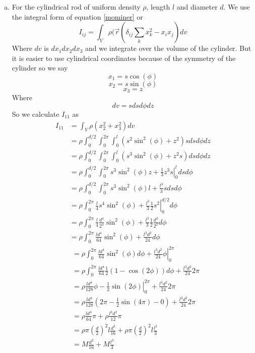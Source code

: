 \documentclass[11pt]{article}
\numberwithin{equation}{section}
\begin{document}
\begin{enumerate}[(a)]
\item
For the cylindrical rod of uniform density $\rho$, length $l$ and diameter $d$. We use the integral form of equation \ref{mominer} or
\begin{equation}
I_{ij} = \int_V \rho(\vec{r}\left(\delta_{ij}\sum_kx^2_k-x_ix_j\right)dv
\label{intmominer}
\end{equation}
Where $dv$ is $dx_1dx_2dx_3$ and we integrate over the volume of the cylinder. But it is easier to use cylindrical coordinates because of the symmetry of the cylinder so we say 
$$x_1=s\cos(\phi)$$
$$x_2=s\sin(\phi)$$
$$x_3=z$$
Where
$$dv=sdsd\phi dz$$
So we calculate $I_{11}$ as
\begin{align*}
I_{11} &= \int_V\rho(x^2_2+x^2_3)dv\\
&= \rho\int_0^{d/2}\int_0^{2\pi}\int_0^l(s^2\sin^2(\phi)+z^2)sdsd\phi dz\\
&= \rho\int_0^{d/2}\int_0^{2\pi}\int_0^l(s^3\sin^2(\phi)+z^2s)dsd\phi dz\\
&= \rho\int_0^{d/2}\int_0^{2\pi}\left.s^3\sin^2(\phi)z+\frac{1}{3}z^3s\right|_0^ldsd\phi\\
&= \rho\int_0^{d/2}\int_0^{2\pi}\left.s^3\sin^2(\phi)l+\frac{l^3}{3}s\right.dsd\phi\\
&= \rho\int_0^{2\pi}\left.\frac{l}{4}s^4\sin^2(\phi)+\frac{l^3}{3}\frac{1}{2}s^2\right|_0^{d/2}d\phi\\
&= \rho\int_0^{2\pi}\left.\frac{l}{4}\frac{d^4}{2^4}\sin^2(\phi)+\frac{l^3}{3}\frac{1}{2}\frac{d^2}{2^2}\right.d\phi\\
&= \rho\int_0^{2\pi}\left.\frac{ld^4}{64}\sin^2(\phi)+\frac{l^3d^2}{24}\right.d\phi
\end{align*}
\begin{align*}
&= \rho\int_0^{2\pi}\frac{ld^4}{64}\sin^2(\phi)d\phi+\left.\frac{l^3d^2}{24}\phi\right|_0^{2\pi}\\
&= \rho\int_0^{2\pi}\frac{ld^4}{64}\frac{1}{2}(1-\cos(2\phi))d\phi+\frac{l^3d^2}{24}2\pi\\
&= \rho\frac{ld^4}{128}\left.\phi-\frac{1}{2}\sin(2\phi)\right|_0^{2\pi}+\frac{l^3d^2}{24}2\pi\\
&= \rho\frac{ld^4}{128}\left(2\pi-\frac{1}{2}\sin(4\pi)-0\right)+\frac{l^3d^2}{24}2\pi\\
&= \rho\frac{ld^4}{64}\pi+\rho\frac{l^3d^2}{12}\pi\\
&= \rho\pi\left(\frac{d}{2}\right)^2l\frac{d^2}{16}+\rho\pi\left(\frac{d}{2}\right)^2l\frac{l^2}{3}\\
&= M\frac{d^2}{16}+M\frac{l^2}{3}
\end{align*}

\end{enumerate}
\end{document}
